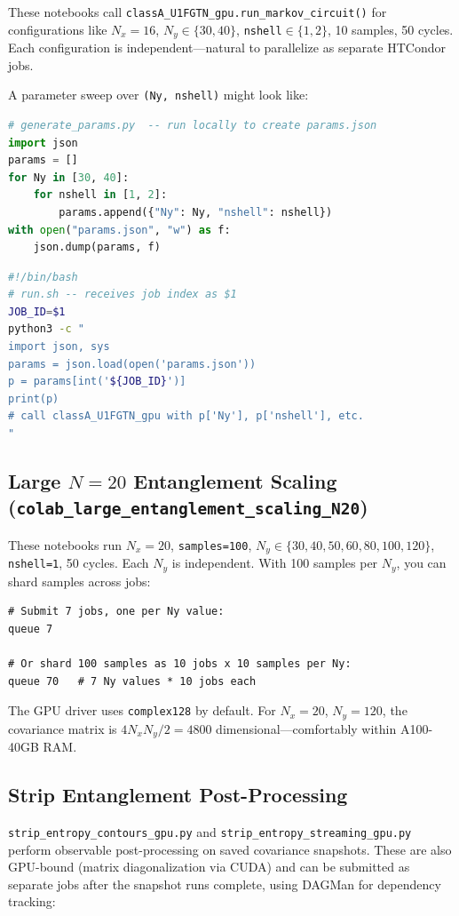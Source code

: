 \documentclass[11pt]{article}
\begin{document}
These notebooks call \texttt{classA\_U1FGTN\_gpu.run\_markov\_circuit()} for
configurations like $N_x{=}16$, $N_y{\in}\{30,40\}$, \texttt{nshell}$\in\{1,2\}$,
10 samples, 50 cycles. Each configuration is independent---natural to
parallelize as separate HTCondor jobs.

A parameter sweep over \texttt{(Ny, nshell)} might look like:

\begin{lstlisting}[language=python]
# generate_params.py  -- run locally to create params.json
import json
params = []
for Ny in [30, 40]:
    for nshell in [1, 2]:
        params.append({"Ny": Ny, "nshell": nshell})
with open("params.json", "w") as f:
    json.dump(params, f)
\end{lstlisting}

\begin{lstlisting}[language=bash]
#!/bin/bash
# run.sh -- receives job index as $1
JOB_ID=$1
python3 -c "
import json, sys
params = json.load(open('params.json'))
p = params[int('${JOB_ID}')]
print(p)
# call classA_U1FGTN_gpu with p['Ny'], p['nshell'], etc.
"
\end{lstlisting}

\subsection{Large $N{=}20$ Entanglement Scaling (\texttt{colab\_large\_entanglement\_scaling\_N20})}

These notebooks run $N_x{=}20$, \texttt{samples=100}, $N_y\in\{30,40,50,60,80,100,120\}$,
\texttt{nshell=1}, 50 cycles. Each $N_y$ is independent. With 100 samples per
$N_y$, you can shard samples across jobs:

\begin{lstlisting}
# Submit 7 jobs, one per Ny value:
queue 7

# Or shard 100 samples as 10 jobs x 10 samples per Ny:
queue 70   # 7 Ny values * 10 jobs each
\end{lstlisting}

The GPU driver uses \texttt{complex128} by default. For $N_x{=}20$, $N_y{=}120$,
the covariance matrix is $4 N_x N_y / 2 = 4800$ dimensional---comfortably
within A100-40GB RAM.

\subsection{Strip Entanglement Post-Processing}

\texttt{strip\_entropy\_contours\_gpu.py} and
\texttt{strip\_entropy\_streaming\_gpu.py} perform observable post-processing
on saved covariance snapshots. These are also GPU-bound (matrix diagonalization
via CUDA) and can be submitted as separate jobs after the snapshot runs
complete, using DAGMan for dependency tracking:
\end{document}
